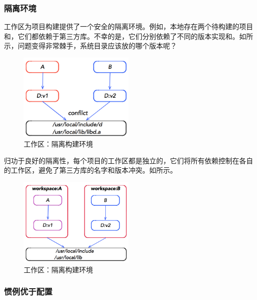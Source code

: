 \begin{content}
\subsubsection{隔离环境}

工作区为项目构建提供了一个安全的隔离环境。例如，本地存在两个待构建的\cpp{}项目和，它们都依赖于第三方\cpp{}库。不幸的是，它们分别依赖了不同的版本实现和。如所示，问题变得非常棘手，系统目录应该放的哪个版本呢？

\begin{figure}[H]
\centering
\includegraphics[width=0.5\textwidth]{figures/bazel-concept-conflict.png}
\caption{工作区：隔离构建环境}
 \label{fig:bazel-concept-conflict}
\end{figure}


归功于良好的隔离性，每个项目的工作区都是独立的，它们将所有依赖控制在各自的工作区，避免了第三方库的名字和版本冲突。如所示。

\begin{figure}[H]
\centering
\includegraphics[width=0.5\textwidth]{figures/bazel-concept-workspace.png}
\caption{工作区：隔离构建环境}
 \label{fig:bazel-concept-workspace}
\end{figure}

\subsubsection{惯例优于配置}


\end{content}
